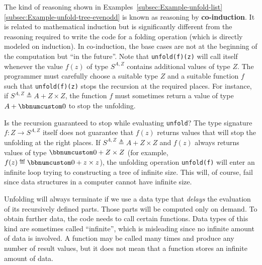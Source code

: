 The kind of reasoning shown in Examples~\ref{subsec:Example-unfold-list}\textendash \ref{subsec:Example-unfold-tree-evenodd}
is known as reasoning by \textbf{co-induction}.
It is related to mathematical induction but is significantly different
from the reasoning required to write the code for a folding operation
(which is directly modeled on induction). In co-induction, the base
cases are not at the beginning of the computation but \textsf{``}in the future\textsf{''}.
Note that \lstinline!unfold(f)(z)! will call itself whenever the
value $f(z)$ of type $S^{A,Z}$ contains additional values of type
$Z$. The programmer must carefully choose a suitable type $Z$ and
a suitable function $f$ such that \lstinline!unfold(f)(z)! stops
the recursion at the required places. For instance, if $S^{A,Z}\triangleq A+Z\times Z$,
the function $f$ must sometimes return a value of type $A+\bbnum 0$
to stop the unfolding.

Is the recursion guaranteed to stop while evaluating \lstinline!unfold!?
The type signature $f:Z\rightarrow S^{A,Z}$ itself does not guarantee
that $f(z)$ returns values that will stop the unfolding at the right
places. If $S^{A,Z}\triangleq A+Z\times Z$ and $f(z)$ always returns
values of type $\bbnum 0+Z\times Z$ (for example, $f(z)\triangleq\bbnum 0+z\times z$),
the unfolding operation \lstinline!unfold(f)! will enter an infinite
loop trying to constructing a tree of infinite size. This will, of
course, fail since data structures in a computer cannot have infinite
size.

Unfolding will always terminate if we use a data type that \emph{delays}
the evaluation of its recursively defined parts. Those parts will
be computed only on demand. To obtain further data, the code needs
to call certain functions. Data types of this kind are sometimes called
\textsf{``}infinite\textsf{''}, which is misleading since
no infinite amount of data is involved. A function may be called many
times and produce any number of result values, but it does not mean
that a function stores an infinite amount of data.

